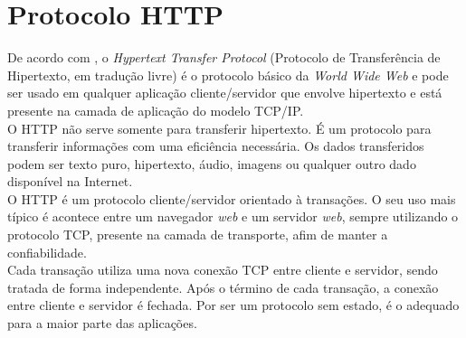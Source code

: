 \section{Protocolo HTTP}
De acordo com , o \textit{Hypertext Transfer 
Protocol} (Protocolo de Transferência de Hipertexto, em tradução livre) é o 
protocolo básico da \textit{World Wide Web} e pode ser usado em qualquer 
aplicação cliente/servidor que envolve hipertexto e está presente na camada de 
aplicação do modelo TCP/IP.\\
O HTTP não serve somente para transferir hipertexto. É um protocolo para transferir informações com uma eficiência necessária. Os dados transferidos podem ser texto puro, hipertexto, áudio, imagens ou qualquer outro dado disponível na Internet.\\
O HTTP é um protocolo cliente/servidor orientado à transações. O seu uso 
mais típico é acontece entre um navegador \textit{web} e um servidor 
\textit{web}, sempre utilizando o protocolo TCP, presente na camada de 
transporte, afim de manter a confiabilidade.\\
Cada transação utiliza uma nova conexão TCP entre cliente e servidor, sendo 
tratada de forma independente. Após o término de cada transação, a conexão 
entre cliente e servidor é fechada. Por ser um protocolo sem estado, é o 
adequado para a maior parte das aplicações.\\
